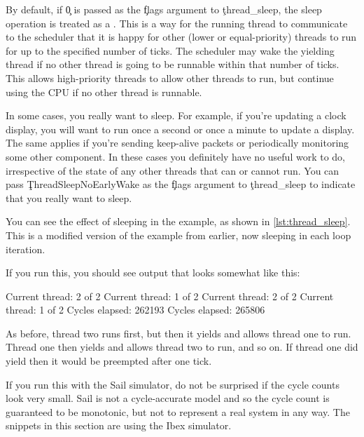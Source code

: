By default, if \c{0} is passed as the \c{flags} argument to \c{thread_sleep}, the sleep operation is treated as a .
This is a way for the running thread to communicate to the scheduler that it is happy for other (lower or equal-priority) threads to run for up to the specified number of ticks.
The scheduler may wake the yielding thread if no other thread is going to be runnable within that number of ticks.
This allows high-priority threads to allow other threads to run, but continue using the CPU if no other thread is runnable.

In some cases, you really want to sleep.
For example, if you're updating a clock display, you will want to run once a second or once a minute to update a display.
The same applies if you're sending keep-alive packets or periodically monitoring some other component.
In these cases you definitely have no useful work to do, irrespective of the state of any other threads that can or cannot run.
You can pass \c{ThreadSleepNoEarlyWake} as the \c{flags} argument to \c{thread_sleep} to indicate that you really want to sleep.

You can see the effect of sleeping in the  example, as shown in \ref{lst:thread_sleep}.
This is a modified version of the  example from earlier, now sleeping in each loop iteration.

\codelisting[filename=examples/thread_sleep/current.cc,marker=entry,label=lst:thread_sleep,caption="A simple example of thread sleeping"]{}

If you run this, you should see output that looks somewhat like this:

\begin{console}
Current thread: 2 of 2
Current thread: 1 of 2
Current thread: 2 of 2
Current thread: 1 of 2
Cycles elapsed: 262193
Cycles elapsed: 265806
\end{console}

As before, thread two runs first, but then it yields and allows thread one to run.
Thread one then yields and allows thread two to run, and so on.
If thread one did  yield then it would be preempted after one tick.

\begin{note}
If you run this with the Sail simulator, do not be surprised if the cycle counts look very small.
Sail is not a cycle-accurate model and so the cycle count is guaranteed to be monotonic, but not to represent a real system in any way.
The snippets in this section are using the Ibex simulator.
\end{note}

